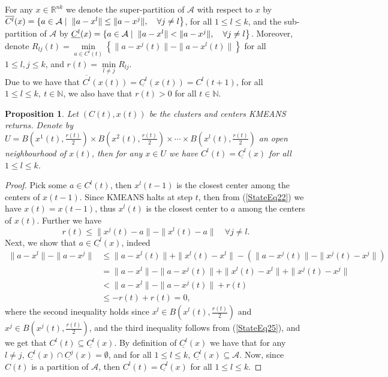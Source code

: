 \documentclass[11pt]{article}
\numberwithin{equation}{section}
\newtheorem{proposition}{Proposition}[section]
\begin{document}
For any $x \in \mathbb{R}^{nk}$ we denote the super-partition of $\mathcal{A}$ with respect to $x$ by $\overline{C^l}(x) = \left\lbrace a \in \mathcal{A} \mid \right. \\ \left. \|a - x^l\| \leq \|a - x^j\| , \quad \forall j \neq l \right\rbrace$, for all $1 \leq l \leq k$, and the sub-partition of $\mathcal{A}$ by $\underline{C^l}(x) = \left\lbrace a \in \mathcal{A} \mid \right. \\ \left. \|a - x^l\| < \|a - x^j\|, \quad \forall j \neq l \right\rbrace$.
Moreover, denote $R_{lj}(t) = \min\limits_{a \in C^l(t)} \left\lbrace \|a - x^j(t)\| - \|a - x^l(t)\| \right\rbrace$ for all $1 \leq l,j \leq k$, and $r(t) = \min\limits_{l \neq j} R_{lj}$. \\
Due to  we have that $\overline{C^l}(x(t)) = \underline{C^l}(x(t)) = C^l(t+1)$, for all $1 \leq l \leq k, \: t \in \mathbb{N}$, we also have that $r(t) > 0$ for all $t \in \mathbb{N}$.

\begin{proposition} \label{StateEq24}
Let $(C(t), x(t))$ be the clusters and centers KMEANS returns. Denote by $U = B\left( x^1(t),\frac{r(t)}{2}\right) \times  B\left( x^2(t),\frac{r(t)}{2}\right) \times \cdots \times B\left( x^l(t),\frac{r(t)}{2} \right)$ an open neighbourhood of $x(t)$, then for any $x \in U$ we have $C^l(t) = \underline{C^l}(x)$ for all $1 \leq l \leq k$.
\end{proposition}

\begin{proof}
Pick some $a \in C^l(t)$, then $x^l(t-1)$ is the closest center among the centers of $x(t-1)$. Since KMEANS halts at step $t$, then from (\ref{StateEq22}) we have $x(t)=x(t-1)$, thus $x^l(t)$ is the closest center to $a$ among the centers of $x(t)$. Further we have
\begin{equation}
	r(t) \leq \|x^j(t) - a\| - \|x^l(t) -a\| \quad \forall j \neq l . \label{StateEq25}
\end{equation}
Next, we show that $a \in \underline{C^l}(x)$, indeed
\begin{align*}
	\|a - x^l\| -  \|a - x^j\| &\leq \|a - x^l(t)\| + \|x^l(t) - x^l\| - \left( \|a - x^j(t)\| - \|x^j(t) - x^j\| \right) \\
	& = \|a - x^l\| - \|a - x^j(t)\| + \|x^l(t) - x^l\| + \|x^j(t) - x^j\| \\
	& < \|a - x^l\| - \|a - x^j(t)\| + r(t) \\
	& \leq -r(t) + r(t) = 0 ,
\end{align*}
where the second inequality holds since $x^l \in B\left( x^l(t), \frac{r(t)}{2} \right)$ and $x^j \in B\left( x^j(t), \frac{r(t)}{2} \right)$, and the third inequality follows from (\ref{StateEq25}), and we get that $C^l(t) \subseteq \underline{C^l}(x)$. 
By definition of $\underline{C^l}(x)$ we have that for any $l \neq j, \: \underline{C^l}(x) \cap \underline{C^j}(x)=\emptyset$, and for all $1 \leq l \leq k, \: \underline{C^l}(x) \subseteq \mathcal{A}$. Now, since $C(t)$ is a partition of $\mathcal{A}$, then $C^l(t) = \underline{C^l}(x)$ for all $1 \leq l \leq k$.
\end{proof}
\end{document}
